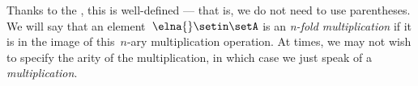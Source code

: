Thanks to the , this is well-defined — that is, we do not need to use parentheses.
We will say that an element~$\elna{} \setin \setA$ is an \emph{n-fold multiplication} if it is in the image of this~$n$-ary multiplication operation.
At times, we may not wish to specify the arity of the multiplication, in which case we just speak of a \emph{multiplication}.

\showslides{
    \begin{forslides}
        \begin{equation}
            \label{eq:sg-mora}
            \mora
        \end{equation}
        \begin{equation}
            \label{eq:sg-morb}
            \morb
        \end{equation}
        \begin{equation}
            \label{eq:sg-morab}
            \morab
        \end{equation}
    \end{forslides}
}
